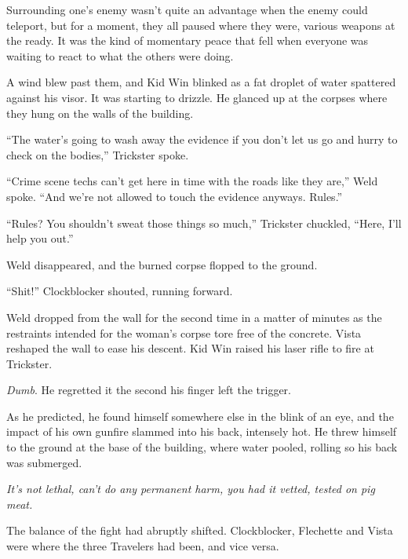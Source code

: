 Surrounding one's enemy wasn't quite an advantage when the enemy could teleport, but for a moment, they all paused where they were, various weapons at the ready.  It was the kind of momentary peace that fell when everyone was waiting to react to what the others were doing.



A wind blew past them, and Kid Win blinked as a fat droplet of water spattered against his visor.  It was starting to drizzle.  He glanced up at the corpses where they hung on the walls of the building.



``The water's going to wash away the evidence if you don't let us go and hurry to check on the bodies,'' Trickster spoke.



``Crime scene techs can't get here in time with the roads like they are,'' Weld spoke.  ``And we're not allowed to touch the evidence anyways.  Rules.''



``Rules?  You shouldn't sweat those things so much,'' Trickster chuckled, ``Here, I'll help you out.''



Weld disappeared, and the burned corpse flopped to the ground.



``Shit!'' Clockblocker shouted, running forward.



Weld dropped from the wall for the second time in a matter of minutes as the restraints intended for the woman's corpse tore free of the concrete.  Vista reshaped the wall to ease his descent.  Kid Win raised his laser rifle to fire at Trickster.



\emph{Dumb}.  He regretted it the second his finger left the trigger.



As he predicted, he found himself somewhere else in the blink of an eye, and the impact of his own gunfire slammed into his back, intensely hot.  He threw himself to the ground at the base of the building, where water pooled, rolling so his back was submerged.



\emph{It's not lethal, can't do any permanent harm, you had it vetted, tested on pig meat.}



The balance of the fight had abruptly shifted.  Clockblocker, Flechette and Vista were where the three Travelers had been, and vice versa.




